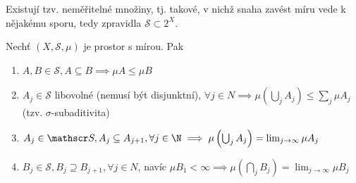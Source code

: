 \begin{poznamka}
  Existují tzv. neměřitelné množiny, tj. takové, v nichž snaha zavést míru vede k nějakému sporu, tedy zpravidla $\mathscr S \subset 2^X$.
\end{poznamka}

\begin{veta}
Nechť $(X, \mathscr S, \mu)$ je prostor s mírou. Pak
\begin{enumerate}[1.]
  \item $A, B \in \mathscr S, A \subseteq B \implies \mu A \leq \mu B$
  \item $A_j \in \mathscr S$ libovolné (nemusí být disjunktní), $\forall j \in N \implies \mu\left(\bigcup_j A_j\right)\leq \sum_j \mu A_j$ (tzv. $\sigma$-subaditivita)
  \item $A_j \in \mathscr S, A_j \subseteq A_{j+1}, \forall j \in \N \implies \mu\left(\bigcup_j A_j \right) = \lim_{j\to \infty} \mu A_j$
  \item $B_j \in \mathscr S, B_j \supseteq B_{j+1}, \forall j \in N$, navíc $\mu B_1 < \infty \implies \mu\left(\bigcap_jB_j\right) = \lim_{j\to \infty} \mu B_j$
\end{enumerate}
\end{veta}

